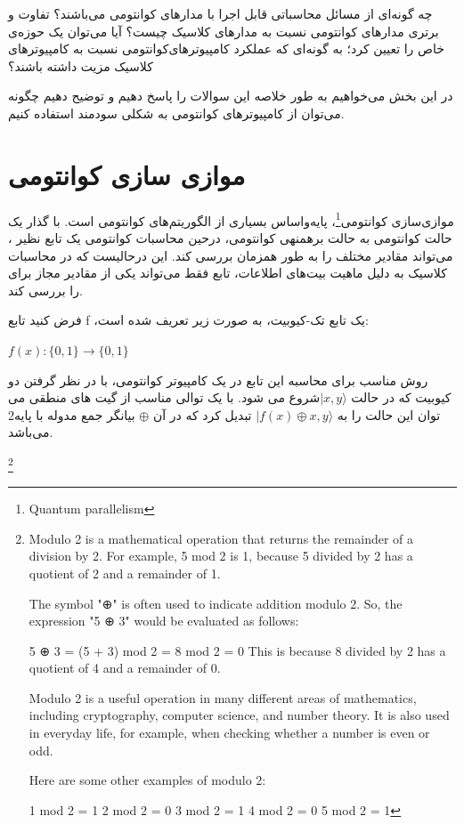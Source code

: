 \documentclass{book}
\begin{document}
چه گونه‌ای از مسائل محاسباتی قابل اجرا با مدارهای کوانتومی می‌باشند؟ 
تفاوت و برتری مدار‌های کوانتومی نسبت به مدار‌های کلاسیک چیست؟
آیا می‌توان یک حوزه‌ی خاص را تعیین کرد؛ به گونه‌ای که عملکرد کامپیوترهای‌‌کوانتومی نسبت به کامپیوتر‌های کلاسیک مزیت داشته باشند؟

در این بخش می‌خواهیم به طور خلاصه این سوالات را پاسخ دهیم و توضیح دهیم چگونه می‌توان از کامپیوتر‌های کوانتومی به شکلی سودمند استفاده کنیم.

\section{موازی سازی کوانتومی}

موازی‌سازی کوانتومی\footnote{Quantum parallelism}، پایه‌واساس بسیاری از الگوریتم‌های کوانتومی است. با گذار یک حالت کوانتومی به حالت برهمنهی کوانتومی، درحین محاسبات کوانتومی یک تابع نظیر ، می‌تواند مقادیر مختلف  را به طور همزمان بررسی کند. این درحالیست که در محاسبات کلاسیک به دلیل ماهیت بیت‌های اطلاعات، تابع  فقط می‌تواند یکی از مقادیر مجاز برای  را بررسی کند.


فرض کنید تابع f ،یک تابع تک-کیوبیت، به صورت زیر تعریف شده است:\\
\begin{center}
	$f (x) : \{0, 1\} \rightarrow \{0, 1\}$\\
\end{center}

روش مناسب برای محاسبه این تابع در یک کامپیوتر کوانتومی، با در نظر گرفتن دو کیوبیت که در حالت $\vert x, y\rangle$شروع می شود. با یک توالی مناسب از گیت های منطقی می توان این حالت را به $\vert f(x) \oplus x, y\rangle$ تبدیل کرد که در آن $\oplus$ بیانگر جمع مدوله با پایه‌2 می‌باشد.

\footnote{Modulo 2 is a mathematical operation that returns the remainder of a division by 2. For example, 5 mod 2 is 1, because 5 divided by 2 has a quotient of 2 and a remainder of 1.
	
	The symbol "⊕" is often used to indicate addition modulo 2. So, the expression "5 ⊕ 3" would be evaluated as follows:
	
	5 ⊕ 3 = (5 + 3) mod 2 = 8 mod 2 = 0
	This is because 8 divided by 2 has a quotient of 4 and a remainder of 0.
	
	Modulo 2 is a useful operation in many different areas of mathematics, including cryptography, computer science, and number theory. It is also used in everyday life, for example, when checking whether a number is even or odd.
	
	Here are some other examples of modulo 2:
	
	1 mod 2 = 1
	2 mod 2 = 0
	3 mod 2 = 1
	4 mod 2 = 0
	5 mod 2 = 1}
\end{document}
